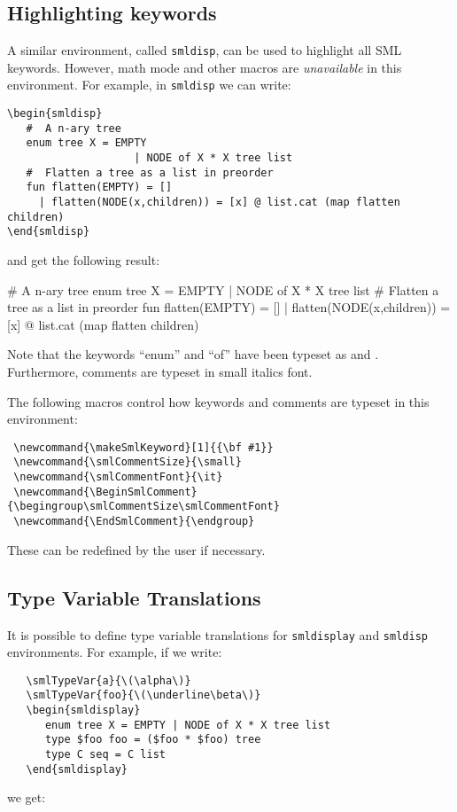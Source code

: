 \documentclass{article}
\begin{document}
\subsection{Highlighting keywords}
A similar environment, called \verb|smldisp|, can be used to highlight
all SML keywords.   However, math mode and other macros are {\em unavailable}
in this environment.  For example, in \verb|smldisp| we can write:
\begin{verbatim}
\begin{smldisp} 
   #  A n-ary tree 
   enum tree X = EMPTY 
                    | NODE of X * X tree list
   #  Flatten a tree as a list in preorder 
   fun flatten(EMPTY) = []
     | flatten(NODE(x,children)) = [x] @ list.cat (map flatten children)
\end{smldisp}
\end{verbatim}
and get the following result:
\begin{smldisp} 
   #  A n-ary tree 
   enum tree X = EMPTY 
                    | NODE of X * X tree list
   #  Flatten a tree as a list in preorder 
   fun flatten(EMPTY) = []
     | flatten(NODE(x,children)) = [x] @ list.cat (map flatten children)
\end{smldisp}

Note that the keywords ``enum'' and ``of'' have been typeset as
 and .  Furthermore, comments are typeset
in small italics font.   

The following macros control how keywords and comments are typeset
in this environment:
\begin{verbatim}
 \newcommand{\makeSmlKeyword}[1]{{\bf #1}}
 \newcommand{\smlCommentSize}{\small}
 \newcommand{\smlCommentFont}{\it}
 \newcommand{\BeginSmlComment}{\begingroup\smlCommentSize\smlCommentFont}
 \newcommand{\EndSmlComment}{\endgroup}
\end{verbatim}
These can be redefined by the user if necessary.

\subsection{Type Variable Translations}
It is possible to define type variable translations for
\verb|smldisplay| and \verb|smldisp| environments.  For example, 
if we write:
\begin{verbatim}
   \smlTypeVar{a}{\(\alpha\)}
   \smlTypeVar{foo}{\(\underline\beta\)}
   \begin{smldisplay} 
      enum tree X = EMPTY | NODE of X * X tree list
      type $foo foo = ($foo * $foo) tree
      type C seq = C list
   \end{smldisplay}
\end{verbatim}
we get:
\end{document}
